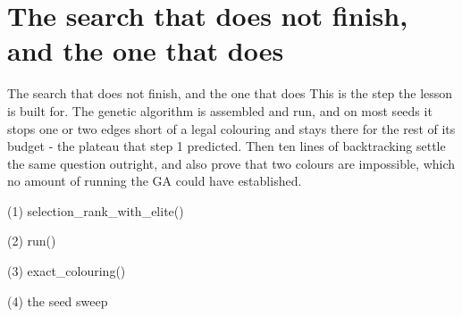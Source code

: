 \section{The search that does not finish, and the one that does}

\begin{frame}{The search that does not finish, and the one that does}
This is the step the lesson is built for. The genetic algorithm is assembled and
run, and on most seeds it stops one or two edges short of a legal colouring and
stays there for the rest of its budget - the plateau that step 1 predicted.
Then ten lines of backtracking settle the same question outright, and also prove
that two colours are impossible, which no amount of running the GA could have
established.
\end{frame}

\begin{frame}[fragile]{(1) selection\_rank\_with\_elite()}

\end{frame}

\begin{frame}[fragile]{(2) run()}

\end{frame}

\begin{frame}[fragile]{(3) exact\_colouring()}

\end{frame}

\begin{frame}[fragile]{(4) the seed sweep}

\end{frame}



